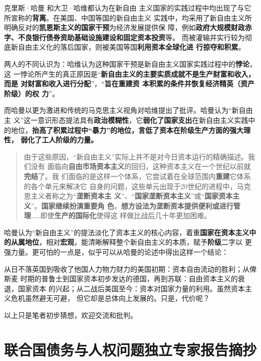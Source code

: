 克里斯·哈曼\cite{chrisharmanneo1} \cite{chrisharmanneo2}和大卫·哈维都认为在新自由
主义国家的实践过程中均出现了与它所宣称的\textbf{背离}。在美国、中国等国的新自由主义
实践中，均采用了新自由主义所明确反对的\textbf{凯恩斯主义的国家干预}为经济发展提供保
障，例如\textbf{政府大规模财政赤字、不良银行债券资助基础设施建设和固定资本投资}等。
而被灌输并实行较为彻底新自由主义化的落后国家，则被美国等国\textbf{利用资本全球化进
  行掠夺和积累}。

两人的不同认识为：哈维认为这种国家干预是新自由主义国家实践过程中的\textbf{悖论}，这
一悖论所产生的真正原因是“\textbf{新自由主义的主要实质成就不是生产财富和收入，而是
  对财富和收入进行分配}”，“\textbf{旨在重建资
  本积累的条件并恢复经济精英（资产阶级）的权
  力}”。

而哈曼以更为激进和传统的马克思主义视角对哈维提出了批评。哈曼认为“新自由主
义”这一意识形态提法具有\textbf{政治模糊性}，它\textbf{弱化了国家支出}在新自由主义实践中
的地位，\textbf{抬高了积累过程中“暴力”的地位，言低了资本在阶级生产方面的强大理性，
  弱化了工人阶级的力量。}
\begin{quotation}
  由于这些原因，“新自由主义”实际上并不是对今日资本运行的精确描述。我们没有
  面临向\textbf{自由市场资本主义}的回归，这种资本主义在一个世纪以前就\textbf{完结}了。我
  们面临的是这样一个体系，它尝试着在全球范围内\textbf{重建}它体系的各个单元来解决它
  自身的问题，这些单元出现于20世纪的进程中，马克思主义者称之为“\textbf{垄断资本主
    义}”、“\textbf{国家垄断资本主义}”或“\textbf{国家资本主义}”。\textbf{国家继续扮演重要角
    色}，\textbf{想方设法为垄断资本提供便利或进行管理}……即使\textbf{生产的国际化}使得这
  样做比战后几十年更加困难。
\end{quotation}

哈曼认为“新自由主义”的提法淡化了资本主义的核心内容，着重\textbf{国家在资本主义中
  的从属地位}，相对\textbf{宏观}，能清晰解释整个新自由主义的本质，赋予\textbf{阶级}二字以
更强力量。更可怕的一点是，似乎可以从哈曼的论述中得出这样一个结论：

从日不落英国到吸收了他国人力物力财力的美国初期：资本自由流动的胜利；从俾斯麦
时期的普鲁士到国家资本初步发达的德国，再到苏联：自由资本主义的衰退，国家资本
的兴起；从二战后美国至今：资本对国家力量的利用。虽然资本主义危机虽然避无可避，
但它却是总体向上发展的。只是，代价呢？

以上只是笔者初步猜想，欢迎交流和批判。



\section[联合国债务与人权独立专家报告]{联合国债务与人权问题独立专家报告摘抄}

